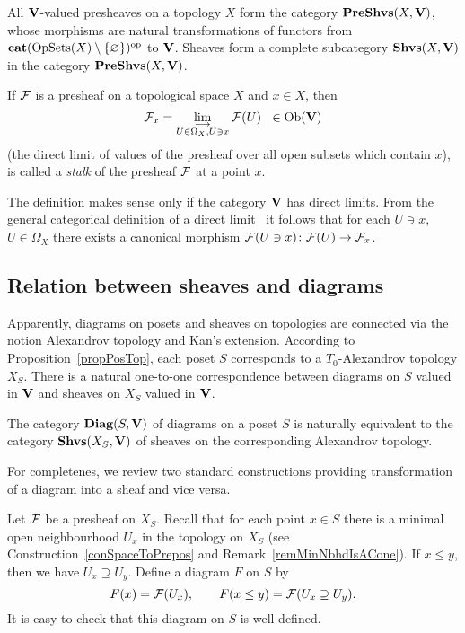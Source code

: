 All $\mathbf{V}$-valued presheaves on a topology $X$ form the category $\mathbf{PreShvs}(X,\mathbf{V})$, whose morphisms are natural transformations of functors from $\mathbf{cat}(\operatorname{OpSets}(X)\setminus\{\varnothing\})^{\operatorname{op}}$ to $\mathbf{V}$. Sheaves form a complete subcategory $\mathbf{Shvs}(X,\mathbf{V})$ in the category $\mathbf{PreShvs}(X,\mathbf{V})$.

\begin{defin}\label{defStalk}
If $\mathcal{F}$ is a presheaf on a topological space $X$ and $x\in X$, then
\[
\mathcal{F}_x=\lim\limits_{\substack{\longrightarrow\\U\in\Omega_X, U\ni x}}\mathcal{F}(U)\hspace{6pt}\in \operatorname{Ob}(\mathbf{V})
\]
(the direct limit of values of the presheaf over all open subsets which contain $x$), is called a \emph{stalk} of the presheaf $\mathcal{F}$ at a point $x$.
\end{defin}

The definition makes sense only if the category $\mathbf{V}$ has direct limits. From the general categorical definition of a direct limit~\cite{MacLane} it follows that for each $U\ni x$, $U\in \Omega_X$ there exists a canonical morphism $\mathcal{F}(U\ni x)\colon \mathcal{F}(U)\to \mathcal{F}_x$.


\subsection{Relation between sheaves and diagrams} 

Apparently, diagrams on posets and sheaves on topologies are connected via the notion Alexandrov topology and Kan's extension. According to Proposition~\ref{propPosTop}, each poset $S$ corresponds to a $T_0$-Alexandrov topology $X_S$. There is a natural one-to-one correspondence between diagrams on $S$ valued in $\mathbf{V}$ and sheaves on $X_S$ valued in $\mathbf{V}$.

\begin{prop}\label{propDiagSheaf}
The category $\mathbf{Diag}(S,\mathbf{V})$ of diagrams on a poset $S$ is naturally equivalent to the category $\mathbf{Shvs}(X_S,\mathbf{V})$ of sheaves on the corresponding Alexandrov topology.
\end{prop}

For completenes, we review two standard constructions providing transformation of a diagram into a sheaf and vice versa.

\begin{con}\label{conSheafToDiag}
Let $\mathcal{F}$ be a presheaf on $X_S$. Recall that for each point $x\in S$ there is a minimal open neighbourhood $U_x$ in the topology on $X_S$ (see Construction~\ref{conSpaceToPrepos} and Remark~\ref{remMinNbhdIsACone}). If $x\leq y$, then we have $U_x\supseteq U_y$. Define a diagram $F$ on $S$ by
\[
F(x)=\mathcal{F}(U_x),\qquad F(x\leq y)=\mathcal{F}(U_x\supseteq U_y).
\]
It is easy to check that this diagram on $S$ is well-defined.
\end{con}

